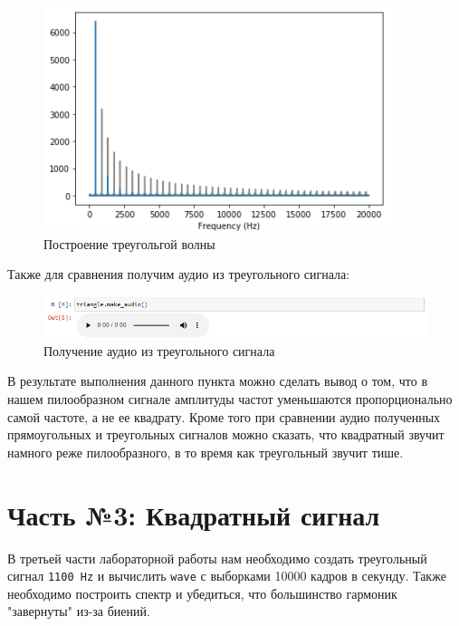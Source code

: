 \documentclass[a4paper]{article}
\begin{document}
            \begin{figure}[H]
                \centering
                \includegraphics[width=\textwidth]{ex_2_compare_triangle.png}
                \caption{Построение треугольгой волны}
                \label{fig:compare_triangle}
            \end{figure}
            
            Также для сравнения получим аудио из треугольного сигнала:
            
            \begin{figure}[H]
                \centering
                \includegraphics[width=\textwidth]{ex_2_compare_triangle_audio.png}
                \caption{Получение аудио из треугольного сигнала}
                \label{fig:compare_triangle_audio}
            \end{figure}
            
            В результате выполнения данного пункта можно сделать вывод о том, что в нашем пилообразном сигнале амплитуды частот уменьшаются пропорционально самой частоте, а не ее квадрату. Кроме того при сравнении аудио полученных прямоугольных и треугольных сигналов можно сказать, что квадратный звучит намного реже пилообразного, в то время как треугольный звучит тише.
            
    \newpage
        \section{Часть №3: Квадратный сигнал}
            В третьей части лабораторной работы нам необходимо создать треугольный сигнал \texttt{1100 Hz} и вычислить \texttt{wave} с выборками 10000 кадров в секунду. Также необходимо построить спектр и убедиться, что большинство гармоник "завернуты" из-за биений.
            
\end{document}
